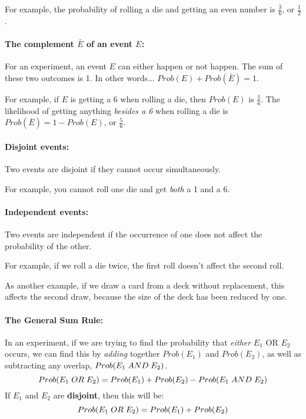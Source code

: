 \documentclass[a4paper,12pt]{book}
\begin{document}
            For example, the probability of rolling a die and getting
            an even number is $\frac{3}{6}$, or $\frac{1}{2}$.

        \paragraph{The complement $\bar{E}$ of an event $E$:}
            For an experiment, an event $E$ can either happen or not
            happen. The sum of these two outcomes is 1. In other words...
            $Prob(E) + Prob(\bar{E}) = 1$.
            
            For example, if $E$ is getting a 6 when rolling a die, then
            $Prob(E)$ is $\frac{1}{6}$. The likelihood of getting anything
            \textit{besides a 6} when rolling a die is $Prob(\bar{E}) = 1 - Prob(E)$,
            or $\frac{5}{6}$.

        \hrulefill

        \paragraph{Disjoint events:}
            Two events are disjoint if they cannot occur simultaneously.

            For example, you cannot roll one die and get \textit{both}
            a 1 and a 6.

        \paragraph{Independent events:}
            Two events are independent if the occurrence of one does not
            affect the probability of the other.

            For example, if we roll a die twice, the first roll doesn't
            affect the second roll.

            As another example, if we draw a card from a deck without replacement,
            this affects the second draw, because the size of the deck has
            been reduced by one.

        \paragraph{The General Sum Rule:}
            In an experiment, if we are trying to find the probability that \textit{either}
            $E_{1}$ OR $E_{2}$ occurs, we can find this by \textit{adding}
            together $Prob(E_{1})$ and $Prob(E_{2})$, as well as subtracting
            any overlap, $Prob(E_{1} \tab[0.1cm] AND \tab[0.1cm] E_{2})$.
            $$ Prob(E_{1} \tab[0.1cm] OR \tab[0.1cm] E_{2})
                = Prob(E_{1}) + Prob(E_{2}) - Prob(E_{1}\tab[0.1cm] AND \tab[0.1cm] E_{2})$$
            If $E_{1}$ and $E_{2}$ are \textbf{disjoint}, then this will be:
            $$ Prob(E_{1} \tab[0.1cm] OR \tab[0.1cm] E_{2})
                = Prob(E_{1}) + Prob(E_{2}) $$
\end{document}

